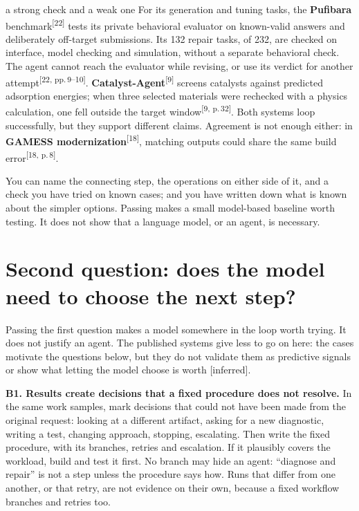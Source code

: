 \documentclass[10pt]{article}
\newcommand{\inferred}{\textsf{\small[inferred]}}
\newcommand{\p}[1]{\textsuperscript{[#1]}}
\begin{document}
\begin{example}{a strong check and a weak one}
For its generation and tuning tasks, the \textbf{Pufibara} benchmark\p{22} tests its private behavioral evaluator on known-valid answers and deliberately off-target submissions. Its 132 repair tasks, of 232, are checked on interface, model checking and simulation, without a separate behavioral check. The agent cannot reach the evaluator while revising, or use its verdict for another attempt\p{22, pp.\,9--10}. \textbf{Catalyst-Agent}\p{9} screens catalysts against predicted adsorption energies; when three selected materials were rechecked with a physics calculation, one fell outside the target window\p{9, p.\,32}. Both systems loop successfully, but they support different claims. Agreement is not enough either: in \textbf{GAMESS modernization}\p{18}, matching outputs could share the same build error\p{18, p.\,8}.
\end{example}

\begin{gate}
You can name the connecting step, the operations on either side of it, and a check you have tried on known cases; and you have written down what is known about the simpler options. Passing makes a small model-based baseline worth testing. It does not show that a language model, or an agent, is necessary.
\end{gate}

\section{Second question: does the model need to choose the next step?}

Passing the first question makes a model somewhere in the loop worth trying.
It does not justify an agent.
The published systems give less to go on here: the cases motivate the questions below, but they do not validate them as predictive signals or show what letting the model choose is worth \inferred.

\textbf{B1. Results create decisions that a fixed procedure does not resolve.}
In the same work samples, mark decisions that could not have been made from the original request: looking at a different artifact, asking for a new diagnostic, writing a test, changing approach, stopping, escalating.
Then write the fixed procedure, with its branches, retries and escalation.
If it plausibly covers the workload, build and test it first.
No branch may hide an agent: ``diagnose and repair'' is not a step unless the procedure says how.
Runs that differ from one another, or that retry, are not evidence on their own, because a fixed workflow branches and retries too.
\end{document}
